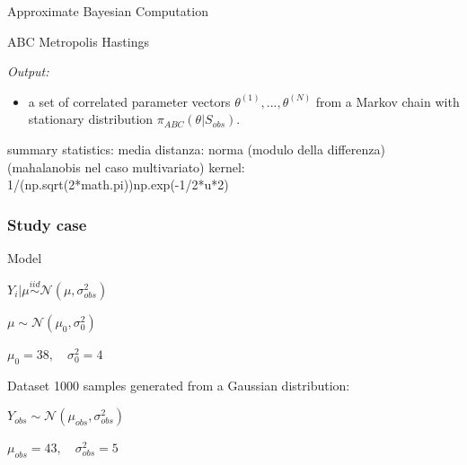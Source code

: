 \documentclass{beamer}
\begin{document}
\begin{section}{Approximate Bayesian Computation}
\begin{frame}{ABC Metropolis Hastings}
{		\emph{Output:}
		\begin{itemize}
			\item a set of correlated parameter vectors $\theta ^ {(1)},..., \theta ^ {(N)}$ from a Markov chain with stationary distribution $\pi_{ABC}(\theta |S_{obs})$.
		\end{itemize}
	}
	\end{frame}
	
	\begin{frame}{}
		summary statistics: media
		distanza: norma (modulo della differenza)   (mahalanobis nel caso multivariato)
		kernel: 1/(np.sqrt(2*math.pi))np.exp(-1/2*u*2)
	\end{frame}

	\begin{frame}
		\frametitle{Study case}
		
		\begin{block}{Model}
			\begin{center}
				$ Y_i | \mu \overset{iid}{\sim} \mathcal{N}(\mu, \sigma_{obs} ^2) $\\
				
				\vspace{0.3cm}
				
				$ \mu  \sim \mathcal{N}(\mu_0, \sigma_0^2)$
				
				$\mu_0 = 38, \quad \sigma^2_0 = 4$
			\end{center}
		\end{block}
		
		\begin{block}{Dataset}
			1000 samples generated from a Gaussian distribution:
			\begin{center}
				$
				Y_{obs} \sim \mathcal{N}(\mu_{obs}, \sigma_{obs} ^2)
				$
				
				$
				\mu_{obs} = 43, \quad
				\sigma_{obs} ^2 = 5
				$
			\end{center}
		\end{block}
	\end{frame}


	
	
	\begin{frame}{}
	\end{frame}
	
	\begin{frame}{}
	\end{frame}


\end{section}
\end{document}
